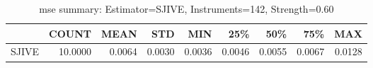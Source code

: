 \begin{table}[ht]
\centering
\caption{mse summary: Estimator=SJIVE, Instruments=142, Strength=0.60}
\begin{tabular}{lrrrrrrrr}
\toprule
 & COUNT & MEAN & STD & MIN & 25\% & 50\% & 75\% & MAX \\
\midrule
SJIVE & 10.0000 & 0.0064 & 0.0030 & 0.0036 & 0.0046 & 0.0055 & 0.0067 & 0.0128 \\
\bottomrule
\end{tabular}
\end{table}
